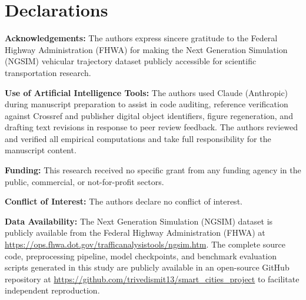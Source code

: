 \documentclass[journal]{IEEEtran}
\begin{document}
\section*{Declarations}

\noindent\textbf{Acknowledgements:} The authors express sincere gratitude to the Federal Highway Administration (FHWA) for making the Next Generation Simulation (NGSIM) vehicular trajectory dataset publicly accessible for scientific transportation research.

\noindent\textbf{Use of Artificial Intelligence Tools:} The authors used Claude (Anthropic) during manuscript preparation to assist in code auditing, reference verification against Crossref and publisher digital object identifiers, figure regeneration, and drafting text revisions in response to peer review feedback. The authors reviewed and verified all empirical computations and take full responsibility for the manuscript content.

\noindent\textbf{Funding:} This research received no specific grant from any funding agency in the public, commercial, or not-for-profit sectors.

\noindent\textbf{Conflict of Interest:} The authors declare no conflict of interest.

\noindent\textbf{Data Availability:} The Next Generation Simulation (NGSIM) dataset is publicly available from the Federal Highway Administration (FHWA) at \url{https://ops.fhwa.dot.gov/trafficanalysistools/ngsim.htm}. The complete source code, preprocessing pipeline, model checkpoints, and benchmark evaluation scripts generated in this study are publicly available in an open-source GitHub repository at \url{https://github.com/trivedismit13/smart_cities_project} to facilitate independent reproduction.



\end{document}
